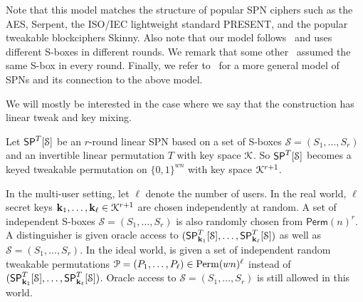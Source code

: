 Note that this model matches the structure of popular SPN ciphers such as the AES, Serpent, the ISO/IEC lightweight standard PRESENT, and the popular tweakable blockciphers Skinny. Also note that our model follows~\cite[Sect. 4.2]{C:CDKLST18} and uses different S-boxes in different rounds. We remark that some other~\cite[Sect. 3]{C:CDKLST18} assumed the same S-box in every round. Finally, we refer to~\cite[Sect. 2.1]{EPRINT:DKSTZ17} for a more general model of SPNs and its connection to the above model.


We will mostly be interested in the case where
we say that the construction has linear tweak and key mixing.








\arrangespace

{}
%
Let $\mathsf{SP}^T[\mathcal{S}]$ be an $r$-round linear SPN based on a set of S-boxes $\mathcal{S}=(S_1, \ldots  ,S_r)$ and an invertible linear permutation $T$ with key space $\mathcal{K}$. So $\mathsf{SP}^T[\mathcal{S}]$
becomes a keyed tweakable permutation on $\{0, 1\}^{wn}$ with key space $\mathcal{K}^{r+1}$.


In the multi-user setting, let $\ell$ denote the number of users. In the real
world, $\ell$ secret keys $\mathbf{k}_1,\ldots,\mathbf{k}_\ell\in\mathcal{K}^{r+1}$ are chosen independently at random.
A set of independent S-boxes $\mathcal{S}=(S_1,\ldots,S_r)$ is also randomly chosen from $\textsf{Perm}(n)^r$. A distinguisher \dis is given oracle access to $(\mathsf{SP}_{\mathbf{k}_1}^T[\mathcal{S}],\ldots,\mathsf{SP}_{\mathbf{k}_\ell}^T[\mathcal{S}])$ as
well as $\mathcal{S}=(S_1,\ldots,S_r)$. In the ideal world, \dis is given a set of independent
random tweakable permutations ${\mathcal{P}}=({P}_1,\ldots,{P}_{\ell})\in{\operatorname{Perm}}(wn)^\ell$ instead of $(\mathsf{SP}_{\mathbf{k}_1}^T[\mathcal{S}],\ldots,\mathsf{SP}_{\mathbf{k}_\ell}^T[\mathcal{S}])$. Oracle access to $\mathcal{S}=(S_1,\ldots,S_r)$ is still allowed in this world.


